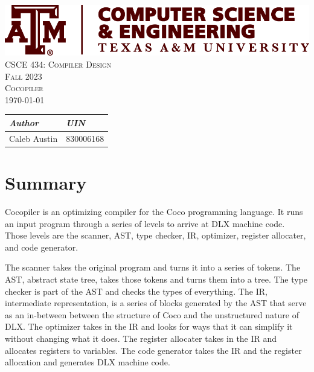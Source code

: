 \documentclass{tamureport}
\def\course{CSCE 434: Compiler Design}      %
\def\thetitle{Cocopiler}               %
\def\date{\today}                         %
\begin{document}
\begin{center}
    
    \vspace*{1.5cm}
    \includegraphics[scale = 0.4]{CSCE_logo.png}\\[1.75cm]
    \textsc{\huge{\course}}\\[.5cm]
    \textsc{\Large{Fall 2023}}\\[.5cm]
    \textsc{\Large{\thetitle}}\\[.5cm]
    \textsc{\date}\\[2cm]
    \vspace{2em} 
    \begin{tabular}{L{4cm} R{4cm}}
        \textit{Author} & \textit{UIN}\\
        \hline
        Caleb Austin & 830006168
    \end{tabular}
\end{center}
\thispagestyle{empty}
\pagebreak


\sloppy


\section*{Summary}
Cocopiler is an optimizing compiler for the Coco programming language. It runs an input program through a series of levels to arrive at DLX machine code. Those levels are the scanner, AST, type checker, IR, optimizer, register allocater, and code generator. 

The scanner takes the original program and turns it into a series of tokens. 
The AST, abstract state tree, takes those tokens and turns them into a tree. 
The type checker is part of the AST and checks the types of everything. 
The IR, intermediate representation, is a series of blocks generated by the AST that serve as an in-between between the structure of Coco and the unstructured nature of DLX. 
The optimizer takes in the IR and looks for ways that it can simplify it without changing what it does. 
The register allocater takes in the IR and allocates registers to variables. 
The code generator takes the IR and the register allocation and generates DLX machine code. 
\end{document}
